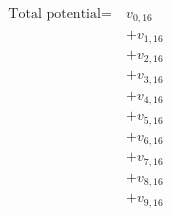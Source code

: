 \documentclass[preview]{standalone}
\begin{document}
\begin{align*}
\text{Total potential} = \  &v_{0,16} \\ &+ v_{1,16} \\ &+ v_{2,16} \\ &+ v_{3,16} \\ &+ v_{4,16} \\ &+ v_{5,16} \\ &+ v_{6,16} \\ &+ v_{7,16} \\ &+ v_{8,16} \\ &+ v_{9,16}
\end{align*}
\end{document}
